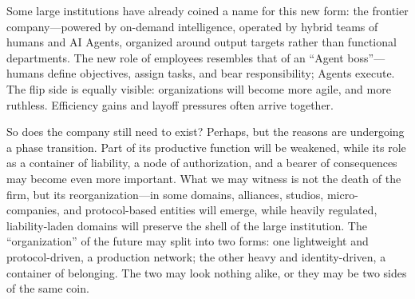 Some large institutions have already coined a name for this new form: the frontier company---powered by on-demand intelligence, operated by hybrid teams of humans and AI Agents, organized around output targets rather than functional departments. The new role of employees resembles that of an ``Agent boss''---humans define objectives, assign tasks, and bear responsibility; Agents execute. The flip side is equally visible: organizations will become more agile, and more ruthless. Efficiency gains and layoff pressures often arrive together.

\vspace{1em}

So does the company still need to exist? Perhaps, but the reasons are undergoing a phase transition.
Part of its productive function will be weakened, while its role as a container of liability, a node of authorization, and a bearer of consequences may become even more important.
What we may witness is not the death of the firm, but its reorganization---in some domains, alliances, studios, micro-companies, and protocol-based entities will emerge, while heavily regulated, liability-laden domains will preserve the shell of the large institution.
The ``organization'' of the future may split into two forms: one lightweight and protocol-driven, a production network; the other heavy and identity-driven, a container of belonging.
The two may look nothing alike, or they may be two sides of the same coin.





